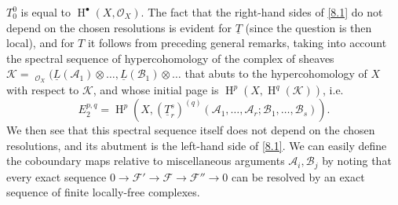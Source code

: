 \documentclass{article}
\theoremstyle{plain}
\theoremstyle{definition}
\newcommand{\sh}[1]{{\mathscr{#1}}}
\DeclareMathOperator{\shHom}{\underline{Hom}}
\DeclareMathOperator{\HH}{H}
\begin{document}
$T_0^0$ is equal to $\HH^\bullet(X,\sh{O}_X)$.
The fact that the right-hand sides of \cref{8.1} do not depend on the chosen resolutions is evident for $\underline{T}$ (since the question is then local), and for $T$ it follows from preceding general remarks, taking into account the spectral sequence of hypercohomology of the complex of sheaves $\sh{K}=\shHom_{\sh{O}_X}(\underline{L}(\sh{A}_1)\otimes\ldots,\underline{L}(\sh{B}_1)\otimes\ldots$ that abuts to the hypercohomology of $X$ with respect to $\sh{K}$, and whose initial page is $\HH^p(X,\HH^q(\sh{K}))$, i.e.
\[
\label{8.2}
  E_2^{p,q} = \HH^p(X,(\underline{T}_r^s)^{(q)}(\sh{A}_1,\ldots,\sh{A}_r;\sh{B}_1,\ldots,\sh{B}_s)).
\tag{8.2}
\]
We then see that this spectral sequence itself does not depend on the chosen resolutions, and its abutment is the left-hand side of \cref{8.1}.
We can easily define the coboundary maps relative to miscellaneous arguments $\sh{A}_i,\sh{B}_j$ by noting that every exact sequence $0\to\sh{F}'\to\sh{F}\to\sh{F}''\to0$ can be resolved by an exact sequence of finite locally-free complexes.
\end{document}
